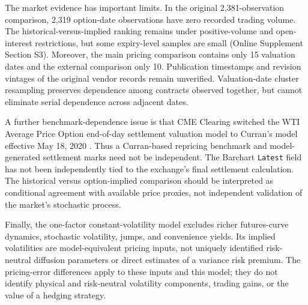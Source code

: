 The market evidence has important limits. In the original 2,381-observation comparison, 2,319 option-date observations have zero recorded trading volume. The historical-versus-implied ranking remains under positive-volume and open-interest restrictions, but some expiry-level samples are small (Online Supplement Section S3). Moreover, the main pricing comparison contains only 15 valuation dates and the external comparison only 10. Publication timestamps and revision vintages of the original vendor records remain unverified. Valuation-date cluster resampling preserves dependence among contracts observed together, but cannot eliminate serial dependence across adjacent dates.

A further benchmark-dependence issue is that CME Clearing switched
the WTI Average Price Option end-of-day settlement valuation model
to Curran's model effective May 18, 2020
\citep{cmeclearing2020curran}. Thus a Curran-based repricing benchmark
and model-generated settlement marks need not be independent.
The Barchart \texttt{Latest} field has not been independently tied to
the exchange's final settlement calculation. The historical versus
option-implied comparison should be interpreted as conditional
agreement with available price proxies, not independent validation
of the market's stochastic process.

Finally, the one-factor constant-volatility model excludes richer futures-curve dynamics, stochastic volatility, jumps, and convenience yields. Its implied volatilities are model-equivalent pricing inputs, not uniquely identified risk-neutral diffusion parameters or direct estimates of a variance risk premium. The pricing-error differences apply to these inputs and this model; they do not identify physical and risk-neutral volatility components, trading gains, or the value of a hedging strategy.
